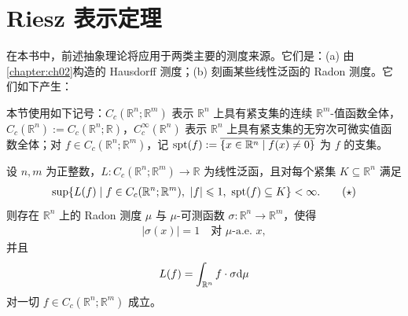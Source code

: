 \documentclass[../../main.tex]{subfiles}%
\begin{document}
\section{Riesz 表示定理}\label{section:ch01-08}

在本书中，前述抽象理论将应用于两类主要的测度来源。它们是：(a) 由\cref{chapter:ch02}构造的 Hausdorff 测度；(b) 刻画某些线性泛函的 Radon 测度。它们如下产生：%

本节使用如下记号：$C_c(\mathbb{R}^n;\mathbb{R}^m)$ 表示 $\mathbb{R}^n$ 上具有紧支集的连续 $\mathbb{R}^m$-值函数全体，$C_c(\mathbb{R}^n):=C_c(\mathbb{R}^n;\mathbb{R})$，$C_c^{\infty}(\mathbb{R}^n)$ 表示 $\mathbb{R}^n$ 上具有紧支集的无穷次可微实值函数全体；对 $f\in C_c(\mathbb{R}^n;\mathbb{R}^m)$，记 $\operatorname{spt}(f):=\overline{\{x\in\mathbb{R}^n\mid f(x)\neq0\}}$ 为 $f$ 的支集。

\begin{theorem}\label{theorem:ch01-1-38}
设 $n,m$ 为正整数，$L:C_c(\mathbb{R}^n;\mathbb{R}^m)\to\mathbb{R}$ 为线性泛函，且对每个紧集 $K\subseteq\mathbb{R}^n$ 满足
\begin{align*}
\sup\{L(f)\mid f\in C_c(\mathbb{R}^n;\mathbb{R}^m),\ \lvert f\rvert\leqslant1,\ \operatorname{spt}(f)\subseteq K\}<\infty. \qquad(\star)
\end{align*}
则存在 $\mathbb{R}^n$ 上的 Radon 测度 $\mu$ 与 $\mu$-可测函数 $\sigma:\mathbb{R}^n\to\mathbb{R}^m$，使得
\begin{align*}
\lvert\sigma(x)\rvert=1\quad\text{对 }\mu\text{-a.e. }x,
\end{align*}
并且
\begin{align*}
L(f)=\int_{\mathbb{R}^n}f\cdot\sigma\mathrm{d}\mu
\end{align*}
对一切 $f\in C_c(\mathbb{R}^n;\mathbb{R}^m)$ 成立。
\end{theorem}
\end{document}
